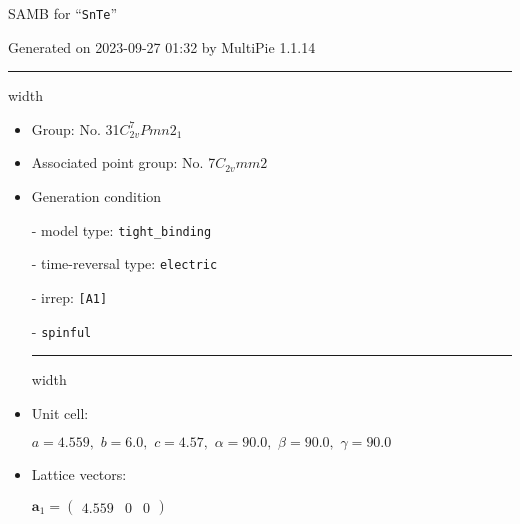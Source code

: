 \documentclass[fleqn,10pt,landscape]{article}
\begin{document}
\setcounter{MaxMatrixCols}{16}

\setlength{\baselineskip}{16pt}
\footnotesize
\begin{center}
\LARGE
SAMB for ``\texttt{SnTe}''
\end{center}
\begin{flushright}
Generated on 2023-09-27 01:32 by MultiPie 1.1.14
\end{flushright}
\vspace{1cm}


 \hfil \hrule height 1mm width \textwidth \hfil

\begin{itemize}
\item Group: No. 31\quad$C_{2v}^{7}$\quad$Pmn2_1$\quad[ orthorhombic ]

\item Associated point group: No. 7\quad$C_{2v}$\quad$mm2$\quad[ orthorhombic ]

\vspace{5mm}

\item Generation condition

\quad - model type: \texttt{tight_binding}

\quad - time-reversal type: \texttt{electric}

\quad - irrep: \texttt{[A1]}

\quad - \texttt{spinful}


 \hfil \hrule height 1mm width \textwidth \hfil

\item Unit cell:

\quad $a=4.559,\,\, b=6.0,\,\, c=4.57,\,\, \alpha=90.0,\,\, \beta=90.0,\,\, \gamma=90.0$

\item Lattice vectors:

\quad $\bm{a}_1=\begin{pmatrix} 4.559 & 0 & 0 \end{pmatrix}$


\end{itemize}
\end{document}
